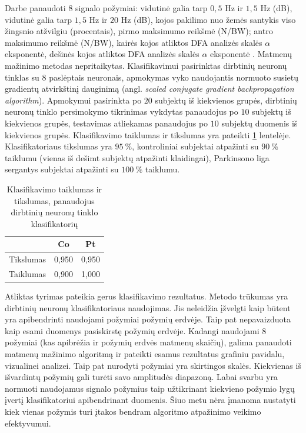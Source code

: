 \documentclass[]{vgtuef}
\begin{document}
Darbe panaudoti $8$ signalo požymiai: vidutinė galia tarp $0,5$ Hz ir $1,5$ Hz (dB), vidutinė galia tarp $1,5$ Hz ir $20$ Hz (dB), kojos pakilimo nuo žemės santykis viso žingsnio atžvilgiu (procentais), pirmo maksimumo reikšmė (N/BW); antro maksimumo reikšmė (N/BW), kairės kojos atliktos DFA analizės skalės $\alpha$ eksponentė, dešinės kojos atliktos DFA analizės skalės $\alpha$ eksponentė \cite{Hausdorff01011997}. Matmenų mažinimo metodas nepritaikytas. Klasifikavimui pasirinktas dirbtinių neuronų tinklas su $8$ paslėptais neuronais, apmokymas vyko naudojantis normuoto susietų gradientų atvirkštinį dauginimą (angl. \textit{scaled conjugate gradient backpropagation algorithm}). Apmokymui pasirinkta po $20$ subjektų iš kiekvienos grupės, dirbtinių neuronų tinklo persimokymo tikrinimas vykdytas panaudojus po $10$ subjektų iš kiekvienos grupės, testavimas atliekamas panaudojus po $10$ subjektų duomenis iš kiekvienos grupės. Klasifikavimo taiklumas ir tikslumas yra pateikti \ref{table:vgtu_ann_scores} lentelėje. Klasifikatoriaus tikslumas yra $95~\%$, kontroliniai subjektai atpažinti su $90~\%$ taiklumu (vienas iš dešimt subjektų atpažinti klaidingai), Parkinsono liga sergantys subjektai atpažinti su $100~\%$ taiklumu.

\begin{table}
  \centering
  \renewcommand{\arraystretch}{1.3}
  \caption{Klasifikavimo taiklumas ir tikslumas, panaudojus dirbtinių neuronų tinklo klasifikatorių \cite{vgtu}}
  \label{table:vgtu_ann_scores}
  \begin{tabular}{|c|c|c|} \hline
    & Co & Pt \\ \hline
    Tikslumas & 0,950 & 0,950 \\ \hline
    Taiklumas & 0,900 & 1,000 \\ \hline
  \end{tabular}
\end{table}

Atliktas tyrimas pateikia gerus klasifikavimo rezultatus. Metodo trūkumas yra dirbtinių neuronų klasifikatoriaus naudojimas. Jis neleidžia įžvelgti kaip būtent yra apibendrinti naudojami požymiai požymių erdvėje. Taip pat nepavaizduota kaip esami duomenys pasiskirstę požymių erdvėje. Kadangi naudojami $8$ požymiai (kas apibrėžia ir požymių erdvės matmenų skaičių), galima panaudoti matmenų mažinimo algoritmą ir pateikti esamus rezultatus grafiniu pavidalu, vizualinei analizei. Taip pat nurodyti požymiai yra skirtingos skalės. Kiekvienas iš išvardintų požymių gali turėti savo amplitudės diapazoną. Labai svarbu yra normuoti naudojamus signalo požymius taip užtikrinant kiekvieno požymio lygų įvertį klasifikatoriui apibendrinant duomenis. Šiuo metu nėra įmanoma nustatyti kiek vienas požymis turi įtakos bendram algoritmo atpažinimo veikimo efektyvumui.
\end{document}
